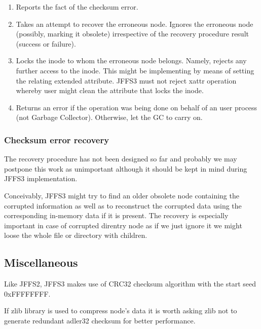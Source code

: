 \documentclass[12pt,a4paper,oneside,titlepage]{article}
\begin{document}
\begin{enumerate}
\item Reports the fact of the checksum error.

\item Takes an attempt to recover the erroneous node. 
Ignores the erroneous node (possibly, marking it obsolete) irrespective
of the recovery procedure result (success or failure).

\item Locks the inode to whom the erroneous node belongs. Namely,
rejects any further access to the inode. This might be implementing by
means of setting the relating extended attribute. JFFS3
must not reject xattr operation whereby user might clean the
attribute that locks the inode.

\item Returns an error if the operation was being done on behalf of an
user process (not Garbage Collector). Otherwise, let the GC to carry on.
\end{enumerate}

%
%
\subsubsection{Checksum error recovery}
The recovery procedure
has not been designed so far and probably we may postpone this work as
unimportant although it should be kept in mind during JFFS3
implementation.

Conceivably, JFFS3 might try to find an older obsolete node
containing the corrupted information as well as to reconstruct the
corrupted data using the corresponding in-memory data if it is present.
The recovery is especially important in case of corrupted direntry node
as if we just ignore it we might loose the whole file or directory with
children.

%
%
\subsection{Miscellaneous}
Like JFFS2, JFFS3 makes use of CRC32 checksum algorithm with the start seed
0xFFFFFFFF.

If zlib library is used to compress node's data it is worth asking zlib not to
generate redundant adler32 checksum for better performance.


%
%
\end{document}
